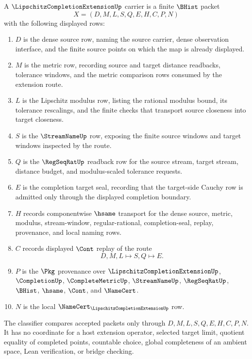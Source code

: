 \begin{definition}
\label{def:lipschitz-completion-extension-carrier}
A $\LipschitzCompletionExtensionUp$ carrier is a finite $\BHist$ packet
$$
X=(D,M,L,S,Q,E,H,C,P,N)
$$
with the following displayed rows:
\begin{enumerate}
\item $D$ is the dense source row, naming the source carrier, dense observation interface, and the finite source points on which the map is already displayed.
\item $M$ is the metric row, recording source and target distance readbacks, tolerance windows, and the metric comparison rows consumed by the extension route.
\item $L$ is the Lipschitz modulus row, listing the rational modulus bound, its tolerance rescalings, and the finite checks that transport source closeness into target closeness.
\item $S$ is the $\StreamNameUp$ row, exposing the finite source windows and target windows inspected by the route.
\item $Q$ is the $\RegSeqRatUp$ readback row for the source stream, target stream, distance budget, and modulus-scaled tolerance requests.
\item $E$ is the completion target seal, recording that the target-side Cauchy row is admitted only through the displayed completion boundary.
\item $H$ records componentwise $\hsame$ transport for the dense source, metric, modulus, stream-window, regular-rational, completion-seal, replay, provenance, and local naming rows.
\item $C$ records displayed $\Cont$ replay of the route
$$
D,M,L \longmapsto S,Q \longmapsto E .
$$
\item $P$ is the $\Pkg$ provenance over $\LipschitzCompletionExtensionUp$, $\CompletionUp$, $\CompleteMetricUp$, $\StreamNameUp$, $\RegSeqRatUp$, $\BHist$, $\hsame$, $\Cont$, and $\NameCert$.
\item $N$ is the local $\NameCert_{\LipschitzCompletionExtensionUp}$ row.
\end{enumerate}
The classifier compares accepted packets only through $D,M,L,S,Q,E,H,C,P,N$. It has no coordinate for a host extension operator, selected target limit, quotient equality of completed points, countable choice, global completeness of an ambient space, Lean verification, or bridge checking.
\end{definition}

